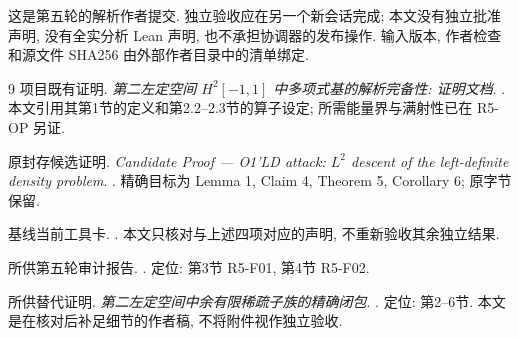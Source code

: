 \documentclass[UTF8,fontset=fandol,11pt,a4paper]{ctexart}
\theoremstyle{definition}
\begin{document}
这是第五轮的解析作者提交. 独立验收应在另一个新会话完成;
本文没有独立批准声明, 没有全实分析 Lean 声明, 也不承担协调器的发布操作.
输入版本, 作者检查和源文件 SHA256 由外部作者目录中的清单绑定.

\begin{thebibliography}{9}
 项目既有证明.
\emph{第二左定空间 $H^2[-1,1]$ 中多项式基的解析完备性: 证明文档}.
.
本文引用其第1节的定义和第2.2--2.3节的算子设定;
所需能量界与满射性已在 R5-OP 另证.

 原封存候选证明.
\emph{Candidate Proof --- O1'LD attack: $L^2$ descent of the left-definite density problem}.
.
精确目标为 Lemma 1, Claim 4, Theorem 5, Corollary 6; 原字节保留.

 基线当前工具卡.
.
本文只核对与上述四项对应的声明, 不重新验收其余独立结果.

 所供第五轮审计报告.
.
定位: 第3节 R5-F01, 第4节 R5-F02.

 所供替代证明.
\emph{第二左定空间中余有限稀疏子族的精确闭包}.
.
定位: 第2--6节. 本文是在核对后补足细节的作者稿, 不将附件视作独立验收.
\end{thebibliography}
\end{document}
